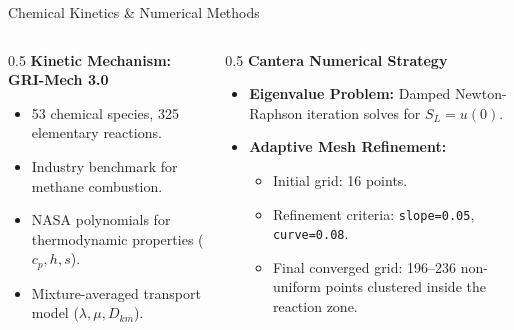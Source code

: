 \documentclass[aspectratio=169, 10pt]{beamer}
\begin{document}
\begin{frame}{Chemical Kinetics \& Numerical Methods}
\begin{columns}[T]
  \begin{column}{0.5\textwidth}
    \textbf{Kinetic Mechanism: GRI-Mech 3.0}
    \begin{itemize}
      \item 53 chemical species, 325 elementary reactions.
      \item Industry benchmark for methane combustion.
      \item NASA polynomials for thermodynamic properties ($c_p, h, s$).
      \item Mixture-averaged transport model ($\lambda, \mu, D_{km}$).
    \end{itemize}
  \end{column}

  \begin{column}{0.5\textwidth}
    \textbf{Cantera Numerical Strategy}
    \begin{itemize}
      \item \textbf{Eigenvalue Problem:} Damped Newton-Raphson iteration solves for $S_L = u(0)$.
      \item \textbf{Adaptive Mesh Refinement:}
        \begin{itemize}
          \item Initial grid: 16 points.
          \item Refinement criteria: \texttt{slope=0.05}, \texttt{curve=0.08}.
          \item Final converged grid: 196--236 non-uniform points clustered inside the reaction zone.
        \end{itemize}
    \end{itemize}
  \end{column}
\end{columns}
\end{frame}
\end{document}
